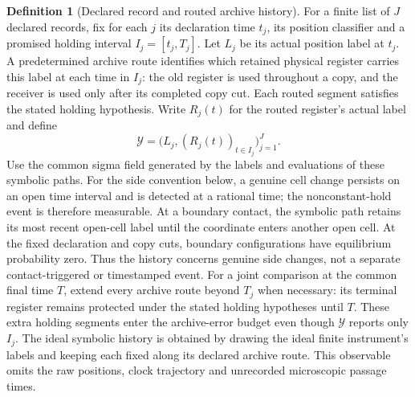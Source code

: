 \documentclass[11pt]{article}
\theoremstyle{definition}\newtheorem{assumption}[theorem]{Constitutive assumption}
\newtheorem{definition}[theorem]{Definition}
\theoremstyle{remark}\newtheorem{remark}[theorem]{Remark}
\begin{document}
\begin{definition}[Declared record and routed archive history]\label{def:history}
For a finite list of $J$ declared records, fix for each $j$ its declaration time $t_j$, its position classifier and a promised holding interval $I_j=[t_j,T_j]$. Let $L_j$ be its actual position label at $t_j$. A predetermined archive route identifies which retained physical register carries this label at each time in $I_j$: the old register is used throughout a copy, and the receiver is used only after its completed copy cut. Each routed segment satisfies the stated holding hypothesis. Write $R_j(t)$ for the routed register's actual label and define
\[
 \mathcal Y=\bigl(L_j,(R_j(t))_{t\in I_j}\bigr)_{j=1}^{J}.
\]
Use the common sigma field generated by the labels and evaluations of these symbolic paths. For the side convention below, a genuine cell change persists on an open time interval and is detected at a rational time; the nonconstant-hold event is therefore measurable. At a boundary contact, the symbolic path retains its most recent open-cell label until the coordinate enters another open cell. At the fixed declaration and copy cuts, boundary configurations have equilibrium probability zero. Thus the history concerns genuine side changes, not a separate contact-triggered or timestamped event. For a joint comparison at the common final time $T$, extend every archive route beyond $T_j$ when necessary: its terminal register remains protected under the stated holding hypotheses until $T$. These extra holding segments enter the archive-error budget even though $\mathcal Y$ reports only $I_j$. The ideal symbolic history is obtained by drawing the ideal finite instrument's labels and keeping each fixed along its declared archive route. This observable omits the raw positions, clock trajectory and unrecorded microscopic passage times.
\end{definition}
\end{document}
